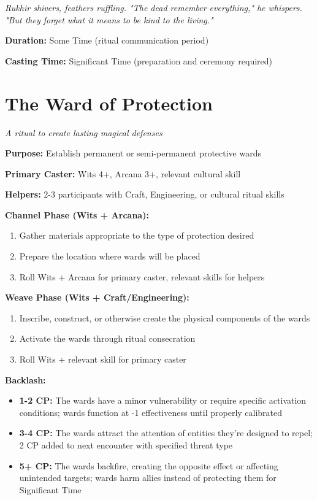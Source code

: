 \documentclass[12pt,twoside]{book}
\newcommand{\shadow}[1]{\textit{#1}}
\begin{document}
\shadow{Rukhir shivers, feathers ruffling. "The dead remember everything," he whispers. "But they forget what it means to be kind to the living."}

\textbf{Duration:} Some Time (ritual communication period)

\textbf{Casting Time:} Significant Time (preparation and ceremony required)

\section*{The Ward of Protection}
\textit{A ritual to create lasting magical defenses}

\textbf{Purpose:} Establish permanent or semi-permanent protective wards

\textbf{Primary Caster:} Wits 4+, Arcana 3+, relevant cultural skill

\textbf{Helpers:} 2-3 participants with Craft, Engineering, or cultural ritual skills

\textbf{Channel Phase (Wits + Arcana):}
\begin{enumerate}
\item Gather materials appropriate to the type of protection desired
\item Prepare the location where wards will be placed
\item Roll Wits + Arcana for primary caster, relevant skills for helpers
\end{enumerate}

\textbf{Weave Phase (Wits + Craft/Engineering):}
\begin{enumerate}
\item Inscribe, construct, or otherwise create the physical components of the wards
\item Activate the wards through ritual consecration
\item Roll Wits + relevant skill for primary caster
\end{enumerate}

\textbf{Backlash:}
\begin{itemize}
\item \textbf{1-2 CP:} The wards have a minor vulnerability or require specific activation conditions; wards function at -1 effectiveness until properly calibrated
\item \textbf{3-4 CP:} The wards attract the attention of entities they're designed to repel; 2 CP added to next encounter with specified threat type
\item \textbf{5+ CP:} The wards backfire, creating the opposite effect or affecting unintended targets; wards harm allies instead of protecting them for Significant Time
\end{itemize}
\end{document}
